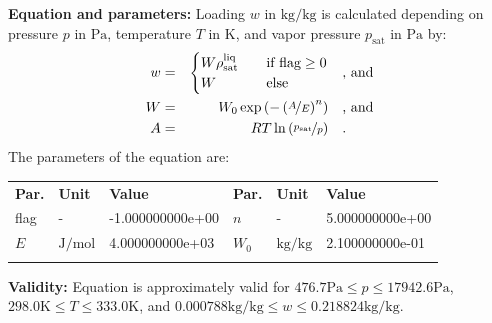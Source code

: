 \textbf{Equation and parameters:}
\newline
%
Loading $w$ in $\si{\kilogram\per\kilogram}$ is calculated depending on pressure $p$ in $\si{\pascal}$, temperature $T$ in $\si{\kelvin}$, and vapor pressure $p_\mathrm{sat}$ in $\si{\pascal}$ by:
%
\begin{equation*}
\begin{split}
w &=& \begin{cases} W \rho_\mathrm{sat}^{\mathrm{liq}} & \quad \text{if flag} \geq 0 \\ W & \quad \text{else} \end{cases} & \quad\text{, and} \\
W &=& W_0 \exp \left( - \left( \nicefrac{A}{E} \right) ^{n} \right) & \quad\text{, and} \\
A &=& R T \ln \left( \nicefrac{p_\mathrm{sat}}{p} \right) & \quad\text{.} \\
\end{split}
\end{equation*}
%
The parameters of the equation are:
%
\begin{longtable}[l]{lll|lll}
\toprule
\addlinespace
\textbf{Par.} & \textbf{Unit} & \textbf{Value} &	\textbf{Par.} & \textbf{Unit} & \textbf{Value} \\
\addlinespace
\midrule
\endhead

\bottomrule
\endfoot
\bottomrule
\endlastfoot
\addlinespace

flag & - & -1.000000000e+00 & $n$ & - & 5.000000000e+00 \\
$E$ & $\si{\joule\per\mole}$ & 4.000000000e+03 & $W_0$ & $\si{\kilogram\per\kilogram}$ & 2.100000000e-01 \\

\addlinespace\end{longtable}

\textbf{Validity:}
\newline
Equation is approximately valid for $476.7 \si{\pascal} \leq p \leq 17942.6 \si{\pascal}$,  $298.0 \si{\kelvin} \leq T \leq 333.0 \si{\kelvin}$, and $0.000788 \si{\kilogram\per\kilogram} \leq w \leq 0.218824 \si{\kilogram\per\kilogram}$.
\newline

